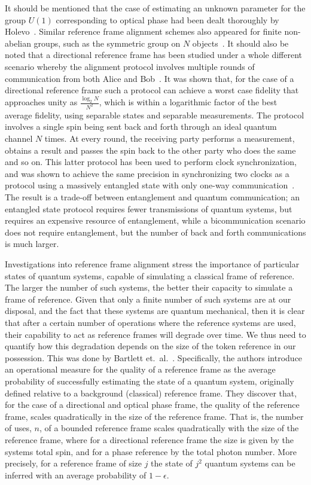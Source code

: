 \documentclass{article}
\begin{document}
It should be mentioned that the case of estimating an unknown parameter for the group $U(1)$ corresponding to optical phase had been dealt thoroughly by Holevo~\cite{H80}.  Similar reference frame alignment schemes also appeared for finite non-abelian groups, such as the symmetric group on $N$ objects~\cite{KK04}.  It should also be noted that a directional reference frame has been studied under a whole different scenario whereby the alignment protocol involves multiple rounds of communication from both Alice and Bob~\cite{RG03}.  It was shown that, for the case of a directional reference frame such a protocol can achieve a worst case fidelity that approaches unity as $\frac{\log_2 N}{N^2}$, which is within a logarithmic factor of the best average fidelity, using separable states and separable measurements.  The protocol involves a single spin being sent back and forth through an ideal quantum channel $N$ times.  At every round, the receiving party performs a measurement, obtains a result and passes the spin back to the other party who does the same and so on.   This latter protocol has been used to perform clock synchronization, and was shown to achieve the same precision in synchronizing two clocks as a protocol using a massively entangled state with only one-way communication~\cite{dBB05}.  The result is a trade-off between entanglement and quantum communication; an entangled state protocol requires fewer transmissions of quantum systems, but requires an expensive resource of entanglement, while a bicommunication scenario does not require entanglement, but the number of back and forth communications is much larger.

Investigations into reference frame alignment stress the importance of particular states of quantum systems, capable of simulating a classical frame of reference.  The larger the number of such systems, the better their capacity to simulate a frame of reference.  Given that only a finite number of such systems are at our disposal, and the fact that these systems are quantum mechanical, then it is clear that after a certain number of operations where the reference systems are used, their capability to act as reference frames will degrade over time.  We thus need to quantify how this degradation depends on the size of the token reference in our possession.  This was done by Bartlett et.~al.~\cite{BRST06}. Specifically, the authors introduce an operational measure for the quality of a reference frame as the average probability of successfully estimating the state of a quantum system, originally defined relative to a background (classical) reference frame.  They discover that, for the case of a directional and optical phase frame, the quality of the reference frame, scales quadratically in the size of the reference frame.  That is, the number of uses, $n$, of a bounded reference frame scales quadratically with the size of the reference frame, where for a directional reference frame the size is given by the systems total spin, and for a phase reference by the total photon number.  More precisely, for a reference frame of size $j$ the state of $j^2$ quantum systems can be inferred with an average probability of $1-\epsilon$.
\end{document}
